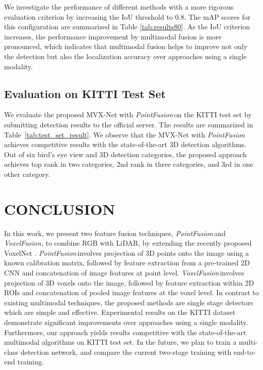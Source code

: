 \documentclass[letterpaper, 10 pt, conference]{ieeeconf}
\newcommand{\PF}{\textit{PointFusion}}
\newcommand{\VF}{\textit{VoxelFusion}}
\begin{document}
We investigate the performance of different methods with a more rigorous evaluation criterion by increasing the IoU threshold to 0.8. The mAP scores for this configuration are summarized in Table \ref{tab:results80}. 
As the IoU criterion increases, the performance improvement by multimodal fusion is more pronounced, which indicates that multimodal fusion helps to improve not only the detection but also the localization accuracy over approaches using
a single modality. \\

\subsection{Evaluation on KITTI Test Set}
\label{ssec:testset}
We evaluate the proposed MVX-Net with \PF{\,}on the KITTI test set by submitting detection results to the official server. The results are summarized in Table~\ref{tab:test_set_result}. We observe that the MVX-Net with \PF{\,}achieves competitive results with the state-of-the-art 3D detection algorithms. Out of six bird’s eye view and 3D detection categories, the proposed approach achieves top rank in two categories,  2nd rank in three categories, and 3rd in one other category.










\section{CONCLUSION}
\label{sec:conclusion}

In this work, we present two feature fusion techniques, \PF{\,}and \VF, to combine RGB with LiDAR, by extending the recently proposed VoxelNet \cite{REF:zhou2017voxelnet}. \PF{\,}involves projection of 3D points onto the image using a known calibration matrix, followed by feature extraction from a pre-trained 2D CNN and concatenation of image features at point level. \VF{\,}involves projection of 3D voxels onto the image, followed by feature extraction within 2D ROIs and concatenation of pooled image features at the voxel level. In contrast to existing multimodal techniques, the proposed methods are single stage detectors which are simple and effective. Experimental results on the KITTI dataset demonstrate significant improvements over approaches using a single modality. Furthermore, our approach yields results competitive with the state-of-the-art multimodal algorithms on KITTI test set. In the future, we plan to train a multi-class detection network, and compare the current two-stage training with end-to-end training. 


















{\small
	
	
}
\end{document}
